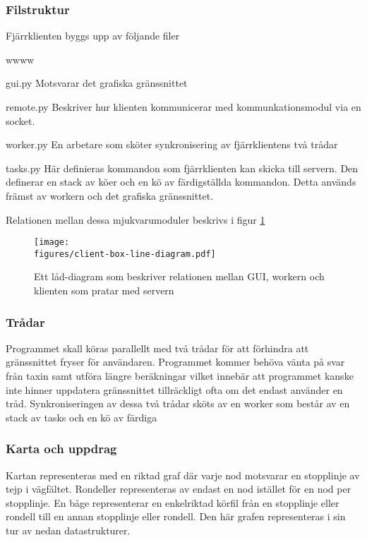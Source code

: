 \documentclass[tekniskrapport/tech.tex]{subfiles}
\begin{document}
\subsubsection{Filstruktur}
Fjärrklienten byggs upp av följande filer

\begin{labeling}{wwww}
	\item[gui.py] 	Motsvarar det grafiska gränssnittet
	
	\item[remote.py] Beskriver hur klienten kommunicerar med
		kommunkationsmodul via en socket.
	
	\item[worker.py] En arbetare som sköter synkronisering av
		fjärrklientens två trådar
	
	\item[tasks.py]	Här definieras kommandon som fjärrklienten kan skicka
		till servern.  Den definerar en stack av köer och en kö av
		färdigställda kommandon.  Detta används främst av workern och
		det grafiska gränssnittet.
\end{labeling}
Relationen mellan dessa mjukvarumoduler beskrivs i figur \ref{boxclient}

\begin{figure}[h]
\centering
	\texttt{[image: \\figures/client-box-line-diagram.pdf]}
	\caption{Ett låd-diagram som beskriver relationen mellan GUI,
	workern och klienten som pratar med servern}
	\label{boxclient}
\end{figure} 

\subsubsection{Trådar}
Programmet skall köras parallellt med två trådar för att förhindra att
gränssnittet fryser för användaren. Programmet kommer behöva vänta på svar från
taxin samt utföra längre beräkningar vilket innebär att programmet kanske inte
hinner uppdatera gränssnittet tillräckligt ofta om det endast använder en tråd.
Synkroniseringen av dessa två trådar sköts av en worker som består av
en stack av tasks och en kö av färdiga 

\subsubsection{Karta och uppdrag}
Kartan representeras med en riktad graf där varje nod motsvarar en stopplinje
av tejp i vägfältet. Rondeller representeras av endast en nod istället för en
nod per stopplinje. En båge representerar en enkelriktad körfil från en
stopplinje eller rondell till en annan stopplinje eller rondell. Den här grafen
representeras i sin tur av nedan datastrukturer.
\end{document}
